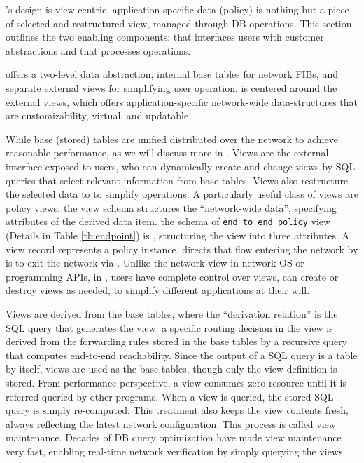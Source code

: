 \label{sec:design}

\Sys's design is view-centric, application-specific data (\eg policy)
is nothing but a piece of selected and restructured view, managed
through DB operations.  This section outlines the two enabling
components: \TI that interfaces users with customer abstractions and
\TR that processes operations.


\TI offers a two-level data abstraction, internal base tables for
network FIBs, and separate external views for simplifying user
operation.  \TI is centered around the external views, which offers
application-specific network-wide data-structures that are
customizability, virtual, and updatable.

 While base (stored) tables are
unified distributed over the network to achieve reasonable
performance, as we will discuss more in \TR. Views are the external
interface exposed to users, who can dynamically create and change
views by SQL queries that select relevant information from base
tables. Views also restructure the selected data to to simplify
operations.  
A particularly useful class of views are policy views: the view schema
structures the ``network-wide data'', specifying attributes of the
derived data item. \Eg the schema of \texttt{end\_to\_end policy} view
(Details in Table \ref{tb:endpoint}) is , structuring the view into three attributes. A view record
represents a policy instance, \eg {} directs that flow
 entering the network by  is to exit the network via
. Unlike the network-view in network-OS or programming APIs, in
\Sys, users have complete control over views, can create or destroy
views as needed, to simplify different applications at their will.

  Views are derived from the base
tables, where the ``derivation relation'' is the SQL query that
generates the view. \Eg a specific routing decision in the
 view is derived from the forwarding rules
stored in the base tables by a recursive query that computes
end-to-end reachability. Since the output of a SQL query is a table by
itself, views are used as the base tables, though only the view
definition is stored.  From performance perspective, a view consumes
zero resource until it is referred \ie queried by other programs. When
a view is queried, the stored SQL query is simply re-computed. This
treatment also keeps the view contents fresh, always reflecting the
latest network configuration. This process is called view
maintenance. Decades of DB query optimization have made view
maintenance very fast, enabling real-time network verification by
simply querying the views.

